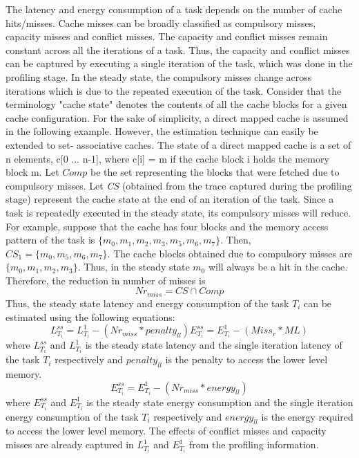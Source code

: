 The latency and energy consumption of a task depends on the number of cache hits/misses.  Cache misses can be broadly classified as compulsory
misses, capacity misses and conflict misses. The capacity and conflict
misses remain constant across all the iterations of a task. Thus, the capacity and conflict misses can be captured by executing a single iteration of the task, which was done in the profiling
stage. In the steady state, the compulsory misses change across iterations which is due to the repeated execution of the task. Consider that the terminology "cache state" denotes the contents of all the cache blocks for a given cache configuration. For the sake of
simplicity, a direct mapped cache is assumed in the following example.
However, the estimation technique can easily be extended to set-
associative caches. The state of a direct mapped cache is a set of n
elements, c[0 ... n-1], where c[i] = m if the cache block i holds the
memory block m. Let $Comp$ be the set representing the blocks that were fetched due to
compulsory misses. Let \textit{CS} (obtained from the
trace captured during the profiling stage) represent the cache state at the end
of an iteration of the task. Since a task is repeatedly executed in the
steady state, its compulsory misses will reduce. For example, suppose
that the cache has four blocks and the memory access pattern of the task
is \begin{math}\lbrace m_0,m_1,m_2,m_3,m_5,m_6,m_7 \rbrace\end{math}.
Then, $CS_{1} =
\lbrace m_0,m_5,m_6,m_7 \rbrace
$.
The cache blocks obtained due to compulsory misses are
\begin{math}\lbrace m_0,m_1,m_2,m_3\rbrace\end{math}.
Thus, in the steady state $m_0$ will always be a hit in the cache.
Therefore, the reduction in number of misses is
\begin{equation}
Nr_{miss} = CS \cap Comp
\end{equation}
Thus, the steady state latency and energy consumption of the task
$T_i$ can be estimated using the following equations:
\begin{equation}
\label{ex1}
L^{ss}_{T_i} = L^{1}_{T_i} - (Nr_{miss} * penalty_{ll})
E^{ss}_{T_i} = E^{1}_{T_i} - (Miss_{r} * ML)
\end{equation}
where $L^{ss}_{T_i}$ and $L^{1}_{T_i}$ is the steady state latency and
the single iteration latency of the task $T_i$ respectively and
$penalty_{ll}$ is the penalty to access the lower level memory.
\begin{equation}
\label{en1}
E^{ss}_{T_i} = E^{1}_{T_i} - (Nr_{miss} * energy_{ll})
\end{equation}
where $E^{ss}_{T_i}$ and $E^{1}_{T_i}$ is the steady state energy
consumption and the single iteration energy consumption of the task $T_i$
respectively and $energy_{ll}$ is the energy required to access the
lower level memory. The effects of conflict misses and capacity misses
are already captured in \begin{math}L^{1}_{T_i}\end{math} and \begin{math}
E^{1}_{T_i}\end{math} from the profiling information.

